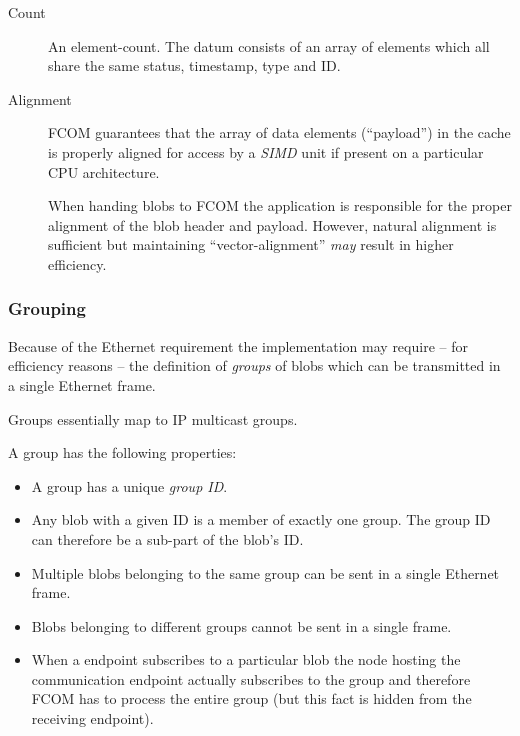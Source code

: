 \documentclass[11pt]{article}
\newcommand{\fcom}{FCOM}
\newcommand{\blob}{blob}
\newcommand{\Blob}{Blob}
\newcommand{\group}{group}
\newcommand{\Group}{Group}
\begin{document}
\begin{description}
        \item[Count] An element-count. The datum consists of an
              array of elements which all share the same status,
              timestamp, type and ID.
		\item[Alignment]
              \fcom{} guarantees that the array of data elements (``payload'')
              in the cache is properly aligned for access by
              a {\em SIMD} unit if present on a particular CPU architecture.

              When handing \blob{}s to \fcom{} the application is responsible
              for the proper alignment of the \blob{} header and payload.
              However, natural alignment is sufficient but maintaining
              ``vector-alignment'' {\em may} result in higher efficiency.
      \end{description}

    \subsubsection{Grouping}
                    Because of the Ethernet requirement
                    the implementation may require -- for
                    efficiency reasons -- 
                    the definition of {\em \group{}s} of
                    \blob{}s which can be transmitted
                    in a single Ethernet frame.
                     
                    \Group{}s essentially map to IP multicast
                    groups.

                    A \group{} has the following properties:
                    \begin{itemize}
                       \item A \group{} has a unique {\em \group{} ID}.
                       \item Any \blob{} with a given ID is a member
                             of exactly one group. The \group{}
                             ID can therefore be a sub-part of the
                             \blob{}'s ID.

                       \item Multiple \blob{}s belonging to 
                             the same \group{} can 
                             be sent in a single Ethernet frame.

                       \item \Blob{}s belonging to different
                             groups cannot be sent in a single
                             frame.

                       \item When a endpoint subscribes to a
                             particular \blob{} the node hosting
                             the communication endpoint actually
                             subscribes to the \group{} and therefore
                             \fcom{} has to process the entire \group{}
                             (but this fact is hidden from the 
                             receiving endpoint).
                    \end{itemize}
\end{document}
